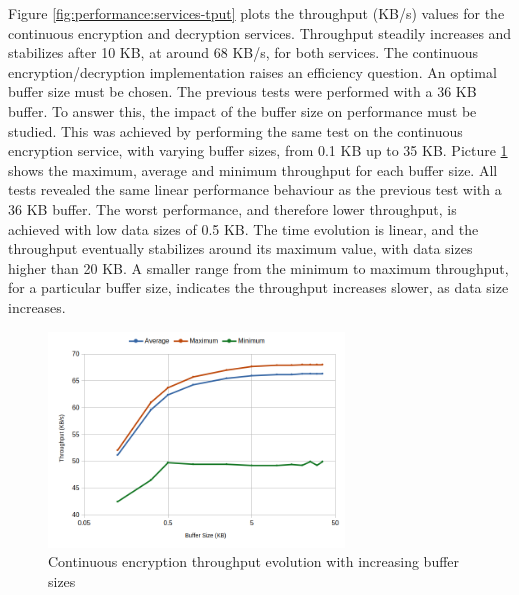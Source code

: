 Figure \ref{fig:performance:services-tput} plots the throughput (KB/s) values for the continuous encryption and decryption services. Throughput steadily increases and stabilizes after 10 KB, at around 68 KB/s, for both services.
The continuous encryption/decryption implementation raises an efficiency question. An optimal buffer size must be chosen. The previous tests were performed with a 36 KB buffer.
To answer this, the impact of the buffer size on performance must be studied.
This was achieved by performing the same test on the continuous encryption service, with varying buffer sizes, from 0.1 KB up to 35 KB. Picture \ref{fig:performance:buffer-tput} shows the maximum, average and minimum throughput for each buffer size.
All tests revealed the same linear performance behaviour as the previous test with a 36 KB buffer. The worst performance, and therefore lower throughput, is achieved with low data sizes of 0.5 KB. The time evolution is linear, and the throughput eventually stabilizes around its maximum value, with data sizes higher than 20 KB.
A smaller range from the minimum to maximum throughput, for a particular buffer size, indicates the throughput increases slower, as data size increases.

\begin{figure}[h!]
	\centering
	\includegraphics[width=0.7\textwidth]{./Images/buffer-tput.png}
	\caption{Continuous encryption throughput evolution with increasing buffer sizes}
	\label{fig:performance:buffer-tput}
\end{figure}


